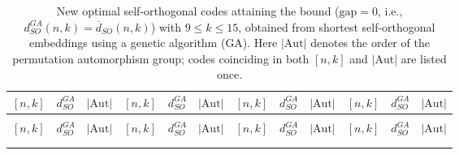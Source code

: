 \documentclass{article}
\begin{document}
\begin{longtable}{c|c|c||c|c|c||c|c|c||c|c|c}
\caption{New optimal self-orthogonal codes attaining the bound
($\mathrm{gap}=0$, i.e.,
$d_{SO}^{GA}(n,k)=\overline{d}_{SO}(n,k)$) with
$9\leq k\leq 15$, obtained from shortest self-orthogonal embeddings
using a genetic algorithm (GA). Here $|\mathrm{Aut}|$ denotes the
order of the permutation automorphism group; codes coinciding in
both $[n,k]$ and $|\mathrm{Aut}|$ are listed once.}
\label{tab:so_embedding_gap0}\\

\hline
$[n,k]$ & $d_{SO}^{GA}$ & $|\mathrm{Aut}|$
& $[n,k]$ & $d_{SO}^{GA}$ & $|\mathrm{Aut}|$
& $[n,k]$ & $d_{SO}^{GA}$ & $|\mathrm{Aut}|$
& $[n,k]$ & $d_{SO}^{GA}$ & $|\mathrm{Aut}|$ \\
\hline
\endfirsthead

\multicolumn{12}{c}{}\\
\hline
$[n,k]$ & $d_{SO}^{GA}$ & $|\mathrm{Aut}|$
& $[n,k]$ & $d_{SO}^{GA}$ & $|\mathrm{Aut}|$
& $[n,k]$ & $d_{SO}^{GA}$ & $|\mathrm{Aut}|$
& $[n,k]$ & $d_{SO}^{GA}$ & $|\mathrm{Aut}|$ \\
\hline
\endhead

\multicolumn{12}{r}{}\\
\endfoot

\endlastfoot


\end{longtable}
\end{document}
